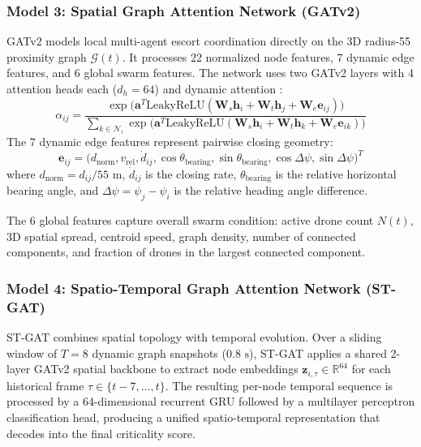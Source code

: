 \documentclass[9pt]{ieeeconf}
\newcommand{\RR}{\mathbb{R}}
\begin{document}
\subsubsection{Model 3: Spatial Graph Attention Network (GATv2)}
GATv2 models local multi-agent escort coordination directly on the 3D radius-55 proximity graph $\mathcal{G}(t)$. It processes 22 normalized node features, 7 dynamic edge features, and 6 global swarm features. The network uses two GATv2 layers with 4 attention heads each ($d_h = 64$) and dynamic attention \cite{brody2022how}:
\begin{equation}
\alpha_{ij} = \frac{\exp\big(\mathbf{a}^T \text{LeakyReLU}(\mathbf{W}_s \mathbf{h}_i + \mathbf{W}_t \mathbf{h}_j + \mathbf{W}_e \mathbf{e}_{ij})\big)}{\sum_{k \in \mathcal{N}_i} \exp\big(\mathbf{a}^T \text{LeakyReLU}(\mathbf{W}_s \mathbf{h}_i + \mathbf{W}_t \mathbf{h}_k + \mathbf{W}_e \mathbf{e}_{ik})\big)}
\end{equation}
The 7 dynamic edge features represent pairwise closing geometry:
\begin{equation}
\mathbf{e}_{ij} = \big( d_{\text{norm}}, v_{\text{rel}}, \dot{d}_{ij}, \cos\theta_{\text{bearing}}, \sin\theta_{\text{bearing}}, \cos\Delta\psi, \sin\Delta\psi \big)^T
\end{equation}
where $d_{\text{norm}} = d_{ij}/55\text{ m}$, $\dot{d}_{ij}$ is the closing rate, $\theta_{\text{bearing}}$ is the relative horizontal bearing angle, and $\Delta\psi = \psi_j - \psi_i$ is the relative heading angle difference.

The 6 global features capture overall swarm condition: active drone count $N(t)$, 3D spatial spread, centroid speed, graph density, number of connected components, and fraction of drones in the largest connected component.

\subsubsection{Model 4: Spatio-Temporal Graph Attention Network (ST-GAT)}
ST-GAT combines spatial topology with temporal evolution. Over a sliding window of $T = 8$ dynamic graph snapshots ($0.8\text{ s}$), ST-GAT applies a shared 2-layer GATv2 spatial backbone to extract node embeddings $\mathbf{z}_{i,\tau} \in \RR^{64}$ for each historical frame $\tau \in \{t-7, \dots, t\}$. The resulting per-node temporal sequence is processed by a 64-dimensional recurrent GRU followed by a multilayer perceptron classification head, producing a unified spatio-temporal representation that decodes into the final criticality score.
\end{document}
